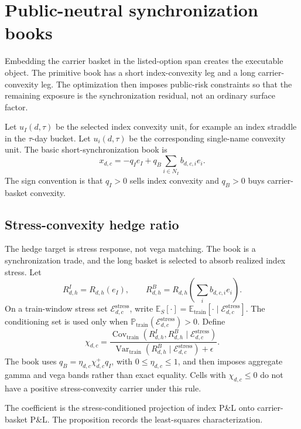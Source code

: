 \documentclass[11pt,a4paper]{amsart}
\theoremstyle{plain}
\theoremstyle{definition}
\theoremstyle{remark}
\DeclareMathOperator{\Var}{Var}
\DeclareMathOperator{\Cov}{Cov}
\newcommand{\PP}{\mathbb{P}}
\newcommand{\EE}{\mathbb{E}}
\newcommand{\cE}{\mathcal{E}}
\begin{document}
\section{Public-neutral synchronization books}\label{sec:book}

Embedding the carrier basket in the listed-option span creates the executable object.  The
primitive book has a short index-convexity leg and a long carrier-convexity leg.  The optimization
then imposes public-risk constraints so that the remaining exposure is the synchronization residual,
not an ordinary surface factor.

Let \(u_I(d,\tau)\) be the selected index convexity unit, for example an index straddle in the
\(\tau\)-day bucket.  Let \(u_i(d,\tau)\) be the corresponding single-name convexity unit.  The
basic short-synchronization book is
\[
        x_{d,c}
        =
        -q_I e_I
        +
        q_B\sum_{i\in N_I}b_{d,c,i}e_i.
\]
The sign convention is that \(q_I>0\) sells index convexity and \(q_B>0\) buys carrier-basket
convexity.

\subsection{Stress-convexity hedge ratio}

The hedge target is stress response, not vega matching.  The book is a synchronization trade, and
the long basket is selected to absorb realized index stress.  Let
\[
        R^I_{d,h}=R_{d,h}(e_I),
        \qquad
        R^B_{d,h}=R_{d,h}\!\left(\sum_i b_{d,c,i}e_i\right).
\]
On a train-window stress set \(\cE_{d,c}^{\mathrm{stress}}\), write
\(\EE_S[\cdot]=\EE_{\mathrm{train}}[\cdot\mid \cE_{d,c}^{\mathrm{stress}}]\).  The conditioning
set is used only when \(\PP_{\mathrm{train}}(\cE_{d,c}^{\mathrm{stress}})>0\).  Define
\[
        \chi_{d,c}
        =
        \frac{
        \Cov_{\mathrm{train}}\!\left(R^I_{d,h},R^B_{d,h}
        \mid \cE_{d,c}^{\mathrm{stress}}\right)
        }{
        \Var_{\mathrm{train}}\!\left(R^B_{d,h}
        \mid \cE_{d,c}^{\mathrm{stress}}\right)+\epsilon
        }.
\]
The book uses \(q_B=\eta_{d,c}\chi_{d,c}^{+}q_I\), with \(0\le\eta_{d,c}\le1\), and then imposes
aggregate gamma and vega bands rather than exact equality.  Cells with \(\chi_{d,c}\le0\) do not have a
positive stress-convexity carrier under this rule.

The coefficient is the stress-conditioned projection of index P\&L onto carrier-basket P\&L.  The
proposition records the least-squares characterization.
\end{document}
